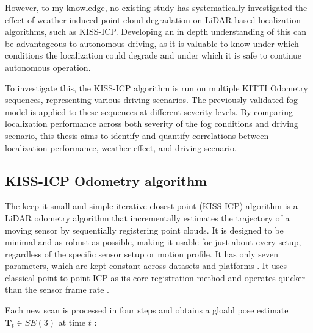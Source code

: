 However, to my knowledge, no existing study has systematically investigated the effect of weather-induced point cloud degradation on LiDAR-based localization algorithms, such as KISS-ICP. Developing an in depth understanding of this can be advantageous to autonomous driving, as it is valuable to know under which conditions the localization could degrade and under which it is safe to continue autonomous operation. 

To investigate this, the KISS-ICP algorithm is run on multiple KITTI Odometry sequences, representing various driving scenarios. The previously validated fog model is applied to these sequences at different severity levels. By comparing localization performance across both severity of the fog conditions and driving scenario, this thesis aims to identify and quantify correlations between localization performance, weather effect, and driving scenario. 

\subsection{KISS-ICP Odometry algorithm}

The keep it small and simple iterative closest point (KISS-ICP) algorithm is a LiDAR odometry algorithm that incrementally estimates the trajectory of a moving sensor by sequentially registering point clouds. It is designed to be minimal and as robust as possible, making it usable for just about every setup, regardless of the specific sensor setup or motion profile. It has only seven parameters, which are kept constant across datasets and platforms \cite{vizzo_kiss-icp_2023}. It uses classical point-to-point ICP as its core registration method and operates quicker than the sensor frame rate \cite{vizzo_kiss-icp_2023}.

Each new scan is processed in four steps and obtains a gloabl pose estimate $\mathbf{T}_t \in SE(3)$ at time $t$ \cite{vizzo_kiss-icp_2023}:


